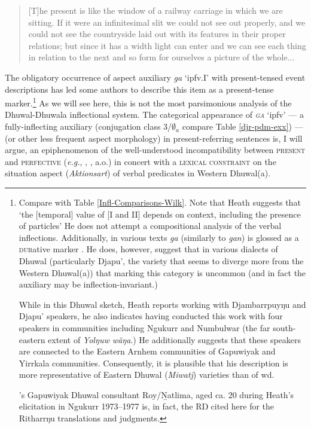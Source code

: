 \begin{quote}\small
	[T]he present is like the window of a railway carriage in which we are sitting. If it were an infinitesimal slit we could not see out properly, and we could not see the countryside laid out with its features in their proper relations; but since it has a width light can enter and we can see each thing in relation to the next and so form for ourselves a picture of the whole...\hfill{\citep[325]{Hamblin1972}}
\end{quote}



\noindent The obligatory occurrence of aspect auxiliary \textit{ga} `\gls{ipfv}.\gls{I}' with present-tensed event descriptions has led some authors \citep[\textit{e.g.},][46]{Heath1980} to describe this item as a present-tense marker.\footnote{Compare with Table \ref{Infl-Comparisons-Wilk}. Note that Heath suggests that `the [temporal] value of [\gls{I} and \gls{II}] depends on context, including the presence of particles' \citeyearpar[38]{Heath1980} He does not attempt a compositional analysis of the verbal inflections. Additionally, in various texts \textit{ga} (similarly to \textit{gan}) is glossed as a \textsc{dur}ative marker \citeyearpar[\textit{e.g.},][183, see also 46]{Heath1980}. He does, however, suggest that in various dialects of Dhuwal (particularly Djapu', the variety that seems to diverge more from the Western Dhuwal(a)) that marking this category is uncommon (and in fact the auxiliary may be inflection-invariant.)
	
	While in this Dhuwal sketch, Heath reports working with Djambarrpuyŋu and Djapu' speakers, he also indicates having conducted this work with four speakers in communities including Ngukurr and Numbulwar (the far south-eastern extent of \textit{Yolŋuw wäŋa}.) He additionally suggests that these speakers are connected to the Eastern Arnhem communities of Gapuwiyak and Yirrkala communities. Consequently, it is plausible that his description is more representative of Eastern Dhuwal (\textit{Miwatj}) varieties than of \gls{wd}.

\citeauthor{Heath1980}'s Gapuwiyak Dhuwal consultant Roy/Ṉatlima, aged ca. 20 during Heath's elicitation in Ngukurr 1973--1977 is, in fact, the RŊ cited here for the Ritharrŋu translations and judgments.

} As we will see here, this is not the most parsimonious analysis of the Dhuwal-Dhuwala inflectional system. The categorical appearance of \textit{\textsc{ga}} `\gls{ipfv}' --- a fully-inflecting auxiliary (conjugation class 3/$ \emptyset_a $ compare Table \ref{djr-pdm-exx}) --- (or other less frequent aspect morphology) in present-referring sentences is, I will argue, an epiphenomenon of the well-understood incompatibility between \textsc{present} and \textsc{perfective} (\textit{e.g.}, \citealp[66\textit{ff}]{Comrie1976}, \citealp[110]{Smith1997}, \citealp{Malchukov2009,Schaden2011,DeWit2016} a.o.) in concert with a \textsc{lexical constraint} on the situation aspect (\textit{Aktionsart}) of verbal predicates in Western Dhuwal(a).

